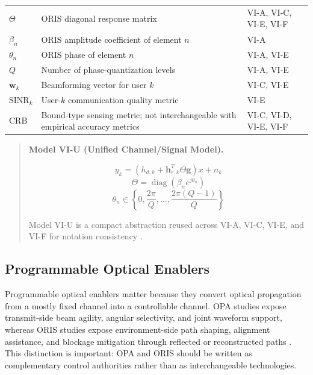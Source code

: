 \documentclass[lettersize,journal]{IEEEtran}
\begin{document}
\begin{table}[!t]
\begin{tabularx}{\columnwidth}{@{}>{\raggedright\arraybackslash}p{1.85cm}>{\raggedright\arraybackslash}X>{\raggedright\arraybackslash}p{1.55cm}@{}}
$\Theta$ & ORIS diagonal response matrix & VI-A, VI-C, VI-E, VI-F \\
$\beta_n$ & ORIS amplitude coefficient of element $n$ & VI-A \\
$\theta_n$ & ORIS phase of element $n$ & VI-A, VI-E \\
$Q$ & Number of phase-quantization levels & VI-A, VI-E \\
$\mathbf{w}_k$ & Beamforming vector for user $k$ & VI-C, VI-E \\
$\mathrm{SINR}_k$ & User-$k$ communication quality metric & VI-E \\
$\mathrm{CRB}$ & Bound-type sensing metric; not interchangeable with empirical accuracy metrics & VI-C, VI-D, VI-E, VI-F \\
\bottomrule
\end{tabularx}
\end{table}




\begin{quote}
\textbf{Model VI-U (Unified Channel/Signal Model).}

\begin{equation}
y_k = \left(h_{d,k} + \mathbf{h}_{r,k}^{T}\Theta\mathbf{g}\right)x + n_k
\end{equation}
\begin{equation}
\Theta = \operatorname{diag}\!\left(\beta_n e^{j\theta_n}\right)
\end{equation}
\begin{equation}
\theta_n \in \left\{0,\frac{2\pi}{Q},\ldots,\frac{2\pi(Q-1)}{Q}\right\}
\end{equation}

Model VI-U is a compact abstraction reused across VI-A, VI-C, VI-E, and VI-F for notation consistency \cite{O_ISAC_061,O_ISAC_091,O_ISAC_098,O_ISAC_127}.
\end{quote}

\subsection{Programmable Optical Enablers}

Programmable optical enablers matter because they convert optical propagation from a mostly fixed channel into a controllable channel. OPA studies expose transmit-side beam agility, angular selectivity, and joint waveform support, whereas ORIS studies expose environment-side path shaping, alignment assistance, and blockage mitigation through reflected or reconstructed paths \cite{O_ISAC_008,O_ISAC_061,O_ISAC_091,O_ISAC_098,O_ISAC_112}. This distinction is important: OPA and ORIS should be written as complementary control authorities rather than as interchangeable technologies.
\end{document}
